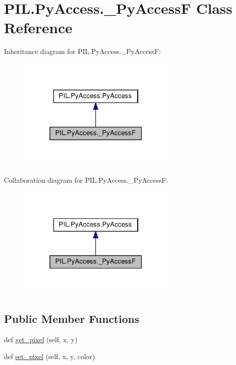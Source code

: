 \hypertarget{classPIL_1_1PyAccess_1_1__PyAccessF}{}\section{P\+I\+L.\+Py\+Access.\+\_\+\+Py\+AccessF Class Reference}
\label{classPIL_1_1PyAccess_1_1__PyAccessF}


Inheritance diagram for P\+I\+L.\+Py\+Access.\+\_\+\+Py\+AccessF\+:
\nopagebreak
\begin{figure}[H]
\begin{center}
\leavevmode
\includegraphics[width=219pt]{classPIL_1_1PyAccess_1_1__PyAccessF__inherit__graph}
\end{center}
\end{figure}


Collaboration diagram for P\+I\+L.\+Py\+Access.\+\_\+\+Py\+AccessF\+:
\nopagebreak
\begin{figure}[H]
\begin{center}
\leavevmode
\includegraphics[width=219pt]{classPIL_1_1PyAccess_1_1__PyAccessF__coll__graph}
\end{center}
\end{figure}
\subsection*{Public Member Functions}
\begin{DoxyCompactItemize}
\item 
def \hyperlink{classPIL_1_1PyAccess_1_1__PyAccessF_aece0367649b030152c53950794697b2f}{get\+\_\+pixel} (self, x, y)
\item 
def \hyperlink{classPIL_1_1PyAccess_1_1__PyAccessF_ae7b455e093870dd387726bf1b1576c09}{set\+\_\+pixel} (self, x, y, color)
\end{DoxyCompactItemize}
